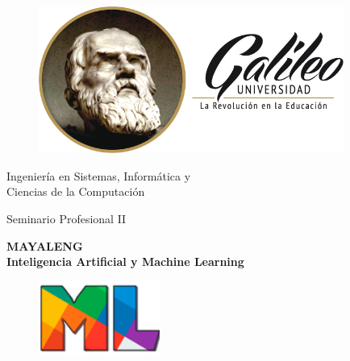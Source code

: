 \documentclass[a4paper,openright,11pt]{article}
\date{}
\begin{document}

\renewcommand{\tablename}{Tabla}
\renewcommand{\listtablename}{\'Indice de tablas}
\renewcommand{\headrulewidth}{0.3pt}
\renewcommand{\footrulewidth}{0.3pt}
\newpage

\begin{titlepage}
	\begin{center}
		\vspace*{-1in}
		\begin{figure}[htb]
			\begin{center}
				\includegraphics[width=10cm]{ug}
			\end{center}
		\end{figure}
		\vspace*{0.1in}
		\begin{Large}
			Ingeniería en Sistemas, Informática y \\Ciencias de la Computación\\
		\end{Large}
		\vspace*{0.2in}
		\begin{Large}
			Seminario Profesional II\\
		\end{Large}
		\vspace*{0.9in}
		\begin{LARGE}
			\textbf{\LARGE MAYALENG} \\
			\textbf{\Large Inteligencia Artificial y Machine Learning} \\
			\begin{figure}[htb]
				\begin{center}
					\includegraphics[width=4cm]{ml}
				\end{center}
			\end{figure}
		\end{LARGE}

\end{center}
\end{titlepage}
\end{document}
